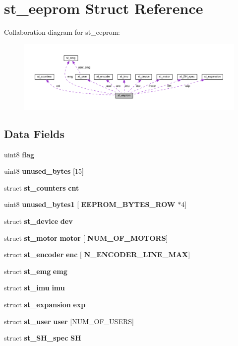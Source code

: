 \section{st\+\_\+eeprom Struct Reference}
\label{structst__eeprom}


Collaboration diagram for st\+\_\+eeprom\+:\nopagebreak
\begin{figure}[H]
\begin{center}
\leavevmode
\includegraphics[width=350pt]{structst__eeprom__coll__graph}
\end{center}
\end{figure}
\subsection*{Data Fields}
\begin{DoxyCompactItemize}
\item 
uint8 \textbf{ flag}
\item 
uint8 \textbf{ unused\+\_\+bytes} [15]
\item 
struct \textbf{ st\+\_\+counters} \textbf{ cnt}
\item 
uint8 \textbf{ unused\+\_\+bytes1} [\textbf{ E\+E\+P\+R\+O\+M\+\_\+\+B\+Y\+T\+E\+S\+\_\+\+R\+OW} $\ast$4]
\item 
struct \textbf{ st\+\_\+device} \textbf{ dev}
\item 
struct \textbf{ st\+\_\+motor} \textbf{ motor} [\textbf{ N\+U\+M\+\_\+\+O\+F\+\_\+\+M\+O\+T\+O\+RS}]
\item 
struct \textbf{ st\+\_\+encoder} \textbf{ enc} [\textbf{ N\+\_\+\+E\+N\+C\+O\+D\+E\+R\+\_\+\+L\+I\+N\+E\+\_\+\+M\+AX}]
\item 
struct \textbf{ st\+\_\+emg} \textbf{ emg}
\item 
struct \textbf{ st\+\_\+imu} \textbf{ imu}
\item 
struct \textbf{ st\+\_\+expansion} \textbf{ exp}
\item 
struct \textbf{ st\+\_\+user} \textbf{ user} [N\+U\+M\+\_\+\+O\+F\+\_\+\+U\+S\+E\+RS]
\item 
struct \textbf{ st\+\_\+\+S\+H\+\_\+spec} \textbf{ SH}
\end{DoxyCompactItemize}


